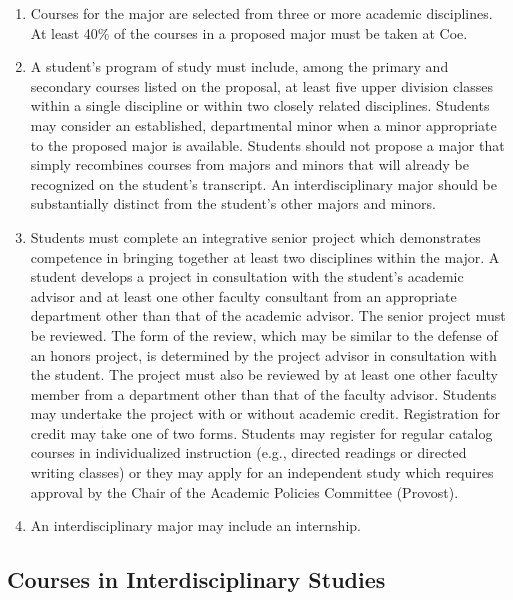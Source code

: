 \documentclass[
  letterpaper,
]{scrbook}
\providecommand{\tightlist}{%
  \setlength{\itemsep}{0pt}\setlength{\parskip}{0pt}}
\begin{document}
\begin{enumerate}
\def\labelenumi{\arabic{enumi}.}
\tightlist
\item
  Courses for the major are selected from three or more academic
  disciplines. At least 40\% of the courses in a proposed major must be
  taken at Coe.\\
\item
  A student's program of study must include, among the primary and
  secondary courses listed on the proposal, at least five upper division
  classes within a single discipline or within two closely related
  disciplines. Students may consider an established, departmental minor
  when a minor appropriate to the proposed major is available. Students
  should not propose a major that simply recombines courses from majors
  and minors that will already be recognized on the student's
  transcript. An interdisciplinary major should be substantially
  distinct from the student's other majors and minors.\\
\item
  Students must complete an integrative senior project which
  demonstrates competence in bringing together at least two disciplines
  within the major. A student develops a project in consultation with
  the student's academic advisor and at least one other faculty
  consultant from an appropriate department other than that of the
  academic advisor. The senior project must be reviewed. The form of the
  review, which may be similar to the defense of an honors project, is
  determined by the project advisor in consultation with the student.
  The project must also be reviewed by at least one other faculty member
  from a department other than that of the faculty advisor. Students may
  undertake the project with or without academic credit. Registration
  for credit may take one of two forms. Students may register for
  regular catalog courses in individualized instruction (e.g., directed
  readings or directed writing classes) or they may apply for an
  independent study which requires approval by the Chair of the Academic
  Policies Committee (Provost).\\
\item
  An interdisciplinary major may include an internship.
\end{enumerate}

\subsection{Courses in Interdisciplinary
Studies}\label{courses-in-interdisciplinary-studies}
\end{document}
